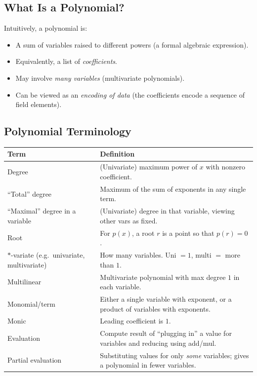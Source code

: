 \documentclass[11pt]{article}
\begin{document}
\subsection{What Is a Polynomial?}

Intuitively, a polynomial is:
\begin{itemize}
  \item A sum of variables raised to different powers (a formal algebraic expression).
  \item Equivalently, a list of \emph{coefficients}.
  \item May involve \emph{many variables} (multivariate polynomials).
  \item Can be viewed as an \emph{encoding of data} (the coefficients encode
        a sequence of field elements).
\end{itemize}

\subsection{Polynomial Terminology}

\begin{center}
\begin{tabular}{|l|p{9cm}|}
\hline
\textbf{Term} & \textbf{Definition} \\
\hline
Degree & (Univariate) maximum power of $x$ with nonzero coefficient. \\
\hline
``Total'' degree & Maximum of the sum of exponents in any single term. \\
\hline
``Maximal'' degree in a variable & (Univariate) degree in that variable, viewing other vars as fixed. \\
\hline
Root & For $p(x)$, a root $r$ is a point so that $p(r) = 0$. \\
\hline
$*$-variate (e.g.\ univariate, multivariate) & How many variables. Uni $= 1$, multi $= $ more than $1$. \\
\hline
Multilinear & Multivariate polynomial with max degree $1$ in each variable. \\
\hline
Monomial/term & Either a single variable with exponent, or a product of variables with exponents. \\
\hline
Monic & Leading coefficient is $1$. \\
\hline
Evaluation & Compute result of ``plugging in'' a value for variables and reducing using add/mul. \\
\hline
Partial evaluation & Substituting values for only \emph{some} variables; gives a polynomial in fewer variables. \\
\hline
\end{tabular}
\end{center}
\end{document}
